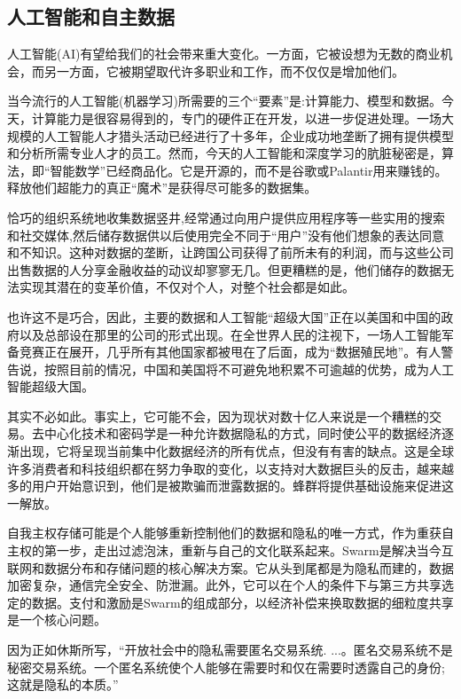 \subsection{人工智能和自主数据\statusgreen} \label{sec:AIdata}

人工智能(AI)有望给我们的社会带来重大变化。一方面，它被设想为无数的商业机会，而另一方面，它被期望取代许多职业和工作，而不仅仅是增加他们\cite{Lee2018Sep}。

当今流行的人工智能(机器学习)所需要的三个“要素”是:计算能力、模型和数据。今天，计算能力是很容易得到的，专门的硬件正在开发，以进一步促进处理。一场大规模的人工智能人才猎头活动已经进行了十多年，企业成功地垄断了拥有提供模型和分析所需专业人才的员工。然而，今天的人工智能和深度学习的肮脏秘密是，算法，即“智能数学”已经商品化。它是开源的，而不是谷歌或Palantir用来赚钱的。释放他们超能力的真正“魔术”是获得尽可能多的数据集。

恰巧的组织系统地收集数据竖井,经常通过向用户提供应用程序等一些实用的搜索和社交媒体,然后储存数据供以后使用完全不同于“用户”没有他们想象的表达同意和不知识。这种对数据的垄断，让跨国公司获得了前所未有的利润，而与这些公司出售数据的人分享金融收益的动议却寥寥无几。但更糟糕的是，他们储存的数据无法实现其潜在的变革价值，不仅对个人，对整个社会都是如此。

也许这不是巧合，因此，主要的数据和人工智能“超级大国”正在以美国和中国的政府以及总部设在那里的公司的形式出现。在全世界人民的注视下，一场人工智能军备竞赛正在展开，几乎所有其他国家都被甩在了后面，成为“数据殖民地”\cite{HarariDavos2020Mar}。有人警告说，按照目前的情况，中国和美国将不可避免地积累不可逾越的优势，成为人工智能超级大国\cite{Lee2018Sep}。

其实不必如此。事实上，它可能不会，因为现状对数十亿人来说是一个糟糕的交易。去中心化技术和密码学是一种允许数据隐私的方式，同时使公平的数据经济逐渐出现，它将呈现当前集中化数据经济的所有优点，但没有有害的缺点。这是全球许多消费者和科技组织都在努力争取的变化，以支持对大数据巨头的反击，越来越多的用户开始意识到，他们是被欺骗而泄露数据的。蜂群将提供基础设施来促进这一解放。

自我主权存储可能是个人能够重新控制他们的数据和隐私的唯一方式，作为重获自主权的第一步，走出过滤泡沫，重新与自己的文化联系起来。Swarm是解决当今互联网和数据分布和存储问题的核心解决方案。它从头到尾都是为隐私而建的，数据加密复杂，通信完全安全、防泄漏。此外，它可以在个人的条件下与第三方共享选定的数据。支付和激励是Swarm的组成部分，以经济补偿来换取数据的细粒度共享是一个核心问题。

因为正如休斯所写，“开放社会中的隐私需要匿名交易系统. ...。匿名交易系统不是秘密交易系统。一个匿名系统使个人能够在需要时和仅在需要时透露自己的身份;这就是隐私的本质。”

